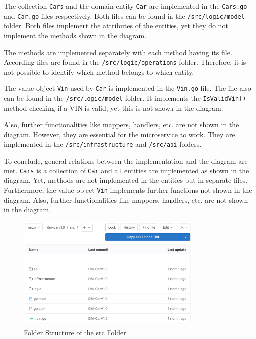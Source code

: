The collection \texttt{Cars} and the domain entity \texttt{Car} are implemented in the \texttt{Cars.go} and \texttt{Car.go} files respectively.
Both files can be found in the \texttt{/src/logic/model} folder.
Both files implement the attributes of the entities, yet they do not implement the methods shown in the diagram.

The methods are implemented separately with each method having its file.
According files are found in the \texttt{/src/logic/operations} folder.
Therefore, it is not possible to identify which method belongs to which entity.

The value object \texttt{Vin} used by \texttt{Car} is implemented in the \texttt{Vin.go} file.
The file also can be found in the \texttt{/src/logic/model} folder.
It implements the \texttt{IsValidVin()} method checking if a VIN is valid, yet this is not shown in the diagram.

Also, further functionalities like mappers, handlers, etc. are not shown in the diagram.
However, they are essential for the microservice to work.
They are implemented in the \texttt{/src/infrastructure} and \texttt{/src/api} folders.

To conclude, general relations between the implementation and the diagram are met.
\texttt{Cars} is a collection of \texttt{Car} and all entities are implemented as shown in the diagram.
Yet, methods are not implemented in the entities but in separate files.
Furthermore, the value object \texttt{Vin} implements further functions not shown in the diagram.
Also, further functionalities like mappers, handlers, etc. are not shown in the diagram.

\begin{figure}
    \centering
    \includegraphics[width=0.8\textwidth]{figures/microservices/dmCar/ms_dmCar_srcFolderStructure.png}
    \caption{Folder Structure of the src Folder}
    \label{fig:ms_dmCar_srcFolderStructure}
\end{figure}
